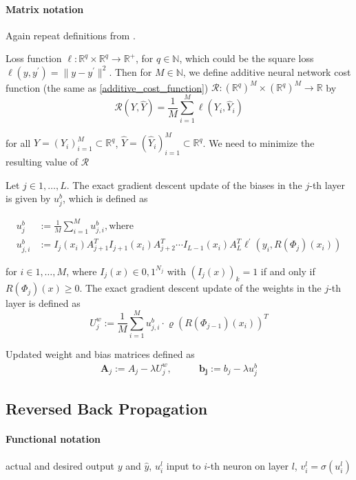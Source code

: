 \documentclass[draft]{article}
\def\RealSet{\mathbb{R}}
\begin{document}
\paragraph{Matrix notation}
Again repeat definitions from \cite{Karner:2022}.

Loss function $\ell \colon \RealSet^q \times  \RealSet^q \rightarrow  \RealSet^{+}$, for $q \in \mathbb{N}$, which could be the square loss $\ell(y,y^\prime)=\| y - y^\prime \|^2$. Then for $M \in \mathbb{N}$, we define additive neural network cost function (the same as \eqref{additive_cost_function}) $\mathcal{R} \colon (\RealSet^q)^M \times (\RealSet^q)^M \rightarrow \RealSet$ by
\[
{\mathcal{R}} (Y,\hat Y) = \frac1{M} \sum_{i=1}^M \ell(Y_i, \hat Y_i)
\]

for all $Y=(Y_i)_{i=1}^M \subset \RealSet^q$, $\hat Y = (\hat Y_i)_{i=1}^M \subset \RealSet^q$. We need to minimize the resulting value of ${\mathcal{R}}$

Let $j \in {1,\ldots,L}$. The exact gradient descent update of the biases in the $j$-th layer is given by $u_j^b$, which is defined as

\begin{align}
u_j^b &:= \frac1{M} \sum_{i=1}^M u_{j,i}^b, \text{where} \\
u_{j,i}^b &:= I_j(x_i)A_{j+1}^T I_{j+1}(x_i) A_{j+2}^T \cdots I_{L-1}(x_i)A_L^T \ell^\prime(y_i, R(\Phi_j)(x_i))
\end{align}

for $i\in {1,\ldots,M}$, where $I_j(x)\in{0,1}^{N_j}$ with $(I_j(x))_k = 1$ if and only if $R(\Phi_j)(x)\geqslant 0$.
The exact gradient descent update of the weights in the $j$-th layer is defined as
\[
U_j^w := \frac{1}{M} \sum_{i=1}^{M} u_{j,i}^b \cdot \varrho(R(\Phi_{j-1})(x_i))^T
\]

Updated weight and bias matrices defined as
\begin{align}
\mathbf{A}_j := A_j - \lambda U_j^w, &\qquad \mathbf{b_j} := b_j - \lambda u_j^b
\end{align}


\subsection{Reversed Back Propagation}

\paragraph{Functional notation}

actual and desired output $y$ and $\hat y$, $u_i^l$ input to $i$-th neuron on layer $l$, $v_i^l = \sigma(u_i^l)$
\end{document}
